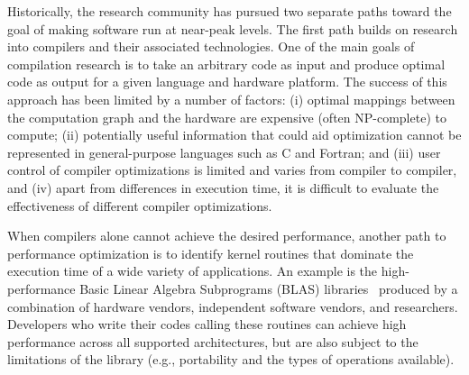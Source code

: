 \documentclass[runningheads]{llncs}
\begin{document}
Historically, the research community has pursued two separate paths toward
the goal of making software run at near-peak levels.  The first path builds
on research into compilers and their associated technologies.  One of the
main goals of compilation research is to take an arbitrary code as input and
produce optimal code as output for a given language and hardware platform.
The success of this approach has been limited by a number of factors: (i)
optimal mappings between the computation graph and the hardware are expensive
(often NP-complete) to compute; (ii) potentially useful information that
could aid optimization cannot be represented in general-purpose languages
such as C and Fortran; and (iii) user control of compiler optimizations is
limited and varies from compiler to compiler, and (iv) apart from differences
in execution time, it is difficult to evaluate the effectiveness of
different compiler optimizations.

When compilers alone cannot achieve the desired performance, 
another path to performance optimization is to identify kernel
routines that dominate the execution time of a wide variety of
applications.  
An example is the high-performance Basic Linear Algebra Subprograms 
(BLAS) libraries~\cite{BLAS} produced by a combination
of hardware vendors, independent software vendors, and researchers.
Developers who write their codes calling these routines can achieve high
performance across all supported architectures, but are also subject to 
the limitations of the library (e.g., portability and the types of operations available).
\end{document}

